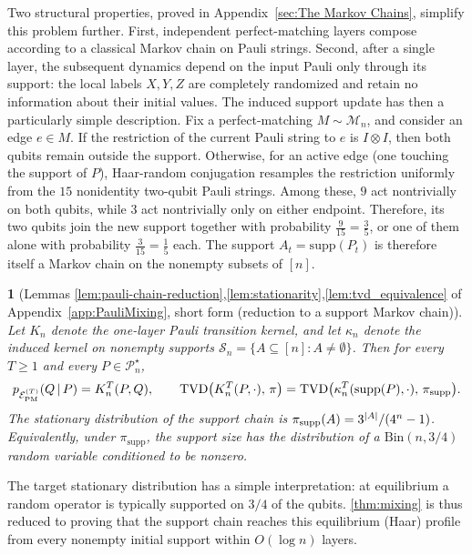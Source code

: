 \documentclass[
    aps,
    superscriptaddress,
    onecolumn,
    10pt,
    prx,
    nofootinbib
]{revtex4-2}
\theoremstyle{namedstatement}
\newtheorem*{namedstatementInner}{}
\theoremstyle{plain}
\newenvironment{restatement}[1]{%
    \begin{namedstatementInner}[#1]%
}{%
    \end{namedstatementInner}%
}
\begin{document}
Two structural properties, proved in Appendix~\ref{sec:The Markov Chains}, simplify this problem further. First, independent perfect-matching layers compose according to a classical Markov chain on Pauli strings. Second, after a single layer, the subsequent dynamics depend on the input Pauli only through its support: the local labels $X,Y,Z$ are completely randomized and retain no information about their initial values. The induced support update has then a particularly simple description. Fix a perfect-matching $M\sim \mathcal{M}_n$, and consider an edge $e\in M$. If the restriction of the current Pauli string to $e$ is $I\otimes I$, then both qubits remain outside the support. Otherwise, for an active
edge (one touching the support of $P$), Haar-random conjugation resamples the restriction uniformly from the $15$ nonidentity two-qubit Pauli strings. Among these, $9$ act nontrivially on both qubits, while $3$ act nontrivially only on either endpoint. Therefore, its two qubits join the new support together with probability $\tfrac{9}{15}=\tfrac35$, or one of them
alone with probability $\tfrac{3}{15}=\tfrac15$ each.  The support
$A_{t}=\mathrm{supp}(P_{t})$ is therefore itself a Markov chain on the nonempty subsets of $[n]$.

\begin{restatement}{Lemmas \ref{lem:pauli-chain-reduction},\ref{lem:stationarity},\ref{lem:tvd_equivalence} of Appendix~\ref{app:PauliMixing}, short form (reduction to a support Markov chain)}
Let $K_{n}$ denote the one-layer Pauli transition kernel, and let $\kappa_{n}$ denote the induced
kernel on nonempty supports $\mathcal{S}_{n}=\{A\subseteq[n]:A\neq\emptyset\}$.
Then for every $T\geq 1$ and every $P\in\mathcal{P}_{n}^{\star}$,
\begin{equation}\label{eq:support-reduction}
 p_{\mathcal{E}_{\rm PM}^{(T)}}(Q\,|\,P)=K_{n}^{T}(P,Q),
 \qquad
 \mathrm{TVD}\bigl(K_{n}^{T}(P,\cdot),\,\pi\bigr)
 =\mathrm{TVD}\bigl(\kappa_{n}^{T}(\mathrm{supp}(P),\cdot),\,\pi_{\rm supp}\bigr).
\end{equation}
The stationary distribution of the support chain is
$\pi_{\rm supp}(A)=3^{|A|}/(4^{n}-1)$. Equivalently, under $\pi_{\mathrm{supp}}$, the support size has the distribution of a
$\mathrm{Bin}(n,3/4)$ random variable conditioned to be nonzero.
\end{restatement}

The target stationary distribution 
has a simple interpretation: at equilibrium a random operator is typically supported on $3/4$ of the qubits. \cref{thm:mixing} is thus reduced to proving that the support chain reaches this equilibrium (Haar) profile from every nonempty initial support within $O(\log{n})$ layers.
\end{document}
